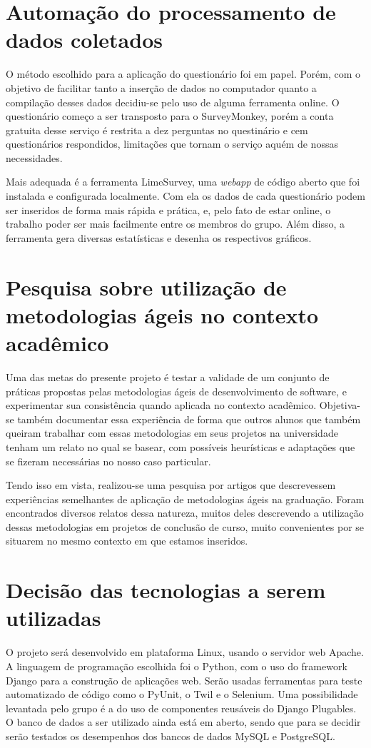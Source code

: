 \documentclass[a4paper,12pt,font=plain,header=plain]{abnt}
\begin{document}
  \section{Automação do processamento de dados coletados}
    O método escolhido para a aplicação do questionário foi em papel. Porém, com o objetivo de facilitar tanto a inserção de dados no computador quanto a compilação desses dados decidiu-se pelo uso de alguma ferramenta online. O questionário começo a ser transposto para o SurveyMonkey, porém a conta gratuita desse serviço é restrita a dez perguntas no questinário e cem questionários respondidos, limitações que tornam o serviço aquém de nossas necessidades.

    Mais adequada é a ferramenta LimeSurvey, uma \textit{webapp} de código aberto que foi instalada e configurada localmente. Com ela os dados de cada questionário podem ser inseridos de forma mais rápida e prática, e, pelo fato de estar online, o trabalho poder ser mais facilmente entre os membros do grupo. Além disso, a ferramenta gera diversas estatísticas e desenha os respectivos gráficos.

  \section{Pesquisa sobre utilização de metodologias ágeis no contexto acadêmico}
    Uma das metas do presente projeto é testar a validade de um conjunto de práticas propostas pelas metodologias ágeis de desenvolvimento de software, e experimentar sua consistência quando aplicada no contexto acadêmico. Objetiva-se também documentar essa experiência de forma que outros alunos que também queiram trabalhar com essas metodologias em seus projetos na universidade tenham um relato no qual se basear, com possíveis heurísticas e adaptações que se fizeram necessárias no nosso caso particular.

    Tendo isso em vista, realizou-se uma pesquisa por artigos que descrevessem experiências semelhantes de aplicação de metodologias ágeis na graduação. Foram encontrados diversos relatos dessa natureza, muitos deles descrevendo a utilização dessas metodologias em projetos de conclusão de curso, muito convenientes por se situarem no mesmo contexto em que estamos inseridos.

  \section{Decisão das tecnologias a serem utilizadas}
    O projeto será desenvolvido em plataforma Linux, usando o servidor web Apache. A linguagem de programação escolhida foi o Python, com o uso do framework Django para a construção de aplicações web. Serão usadas ferramentas para teste automatizado de código como o PyUnit, o Twil e o Selenium. Uma possibilidade levantada pelo grupo é a do uso de componentes reusáveis do Django Plugables. O banco de dados a ser utilizado ainda está em aberto, sendo que para se decidir serão testados os desempenhos dos bancos de dados MySQL e PostgreSQL.
\end{document}
